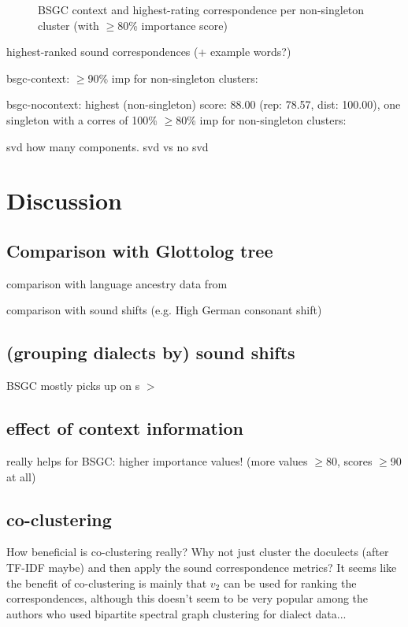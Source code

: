\documentclass[a4paper]{article}
\begin{document}
\begin{figure}
  
  \caption{BSGC context and highest-rating correspondence per non-singleton cluster (with $\geq$80\% importance score)}
  \label{fig:bsgc-context}
\end{figure}


highest-ranked sound correspondences
(+ example words?)

bsgc-context: $\geq$90\% imp for non-singleton clusters:

bsgc-nocontext: highest (non-singleton) score: 88.00  (rep: 78.57, dist: 100.00), one singleton with a corres of 100\%
$\geq$80\% imp for non-singleton clusters:


svd how many components. svd vs no svd


\newpage
\section{Discussion}


\subsection{Comparison with Glottolog tree}
comparison with language ancestry data from \citet{hammarstrom2018glottolog}

comparison with sound shifts (e.g. High German consonant shift)

\subsection{(grouping dialects by) sound shifts}

BSGC mostly picks up on s $>$ \textesh

\subsection{effect of context information}

really helps for BSGC: higher importance values! (more values $\geq$80, scores $\geq$90 at all)

\subsection{co-clustering}
How beneficial is co-clustering really? Why not just cluster the doculects (after TF-IDF maybe) and then apply the sound correspondence metrics? It seems like the benefit of co-clustering is mainly that $v_2$ can be used for ranking the correspondences, although this doesn't seem to be very popular among the authors who used bipartite spectral graph clustering for dialect data...
\end{document}
